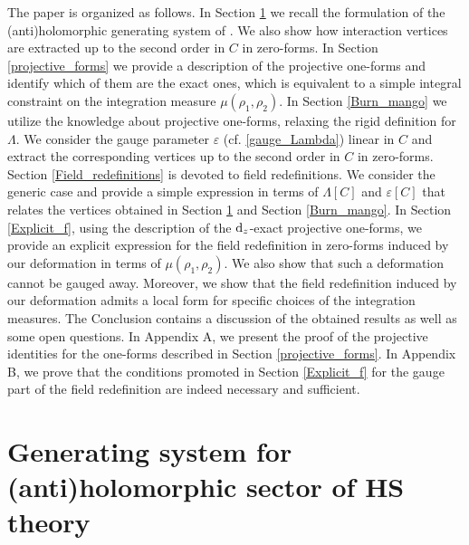 \documentclass[12pt]{article}
\newcommand{\dr}{{{\rm d}}}
\begin{document}
The paper is organized as follows. In Section \ref{Burn_original} we recall the formulation of the (anti)holomorphic generating system of \cite{Didenko:2022qga}. We also show how interaction vertices are extracted up to the second order in $C$ in zero-forms. In Section \ref{projective_forms} we provide a description of the projective one-forms and identify which of them are the exact ones, which is equivalent to a simple integral constraint on the integration measure $\mu(\rho_1,\rho_2)$. In Section \ref{Burn_mango} we utilize the knowledge about projective one-forms, relaxing the rigid definition for $\Lambda$. We consider the gauge parameter $\varepsilon$ (cf. \eqref{gauge_Lambda}) linear in $C$ and extract the corresponding vertices up to the second order in $C$ in zero-forms. Section \ref{Field_redefinitions} is devoted to field redefinitions. We consider the generic case and provide a simple expression in terms of $\Lambda[C]$ and $\varepsilon[C]$ that relates the vertices obtained in Section \ref{Burn_original} and Section \ref{Burn_mango}. In Section \ref{Explicit_f}, using the description of the $\dr_z$-exact projective one-forms, we provide an explicit expression for the field redefinition in zero-forms induced by our deformation in terms of $\mu(\rho_1,\rho_2)$. We also show that such a deformation cannot be gauged away. Moreover, we show that the field redefinition induced by our deformation admits a local form for specific choices of the integration measures. The Conclusion contains a discussion of the obtained results as well as some open questions. In Appendix A, we present the proof of the projective identities for the one-forms described in Section \ref{projective_forms}. In Appendix B, we prove that the conditions promoted in Section \ref{Explicit_f} for the gauge part of the field redefinition are indeed necessary and sufficient.


\section{Generating system for (anti)holomorphic sector of HS theory}\label{Burn_original}
\end{document}
